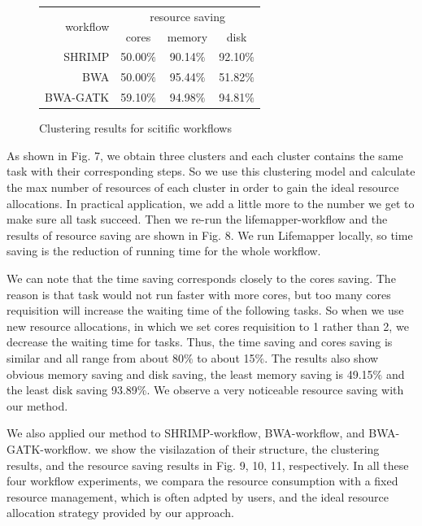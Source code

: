 \documentclass[conference]{IEEEtran}
\begin{document}
\begin{figure}[h]
  \centering 
\begin{tabular}{rccc}
\hline
\multirow{2}{*}{workflow} & \multicolumn{3}{c}{resource saving}\\
& cores & memory & disk\\
\hline
SHRIMP & 50.00$\%$ & 90.14$\%$ & 92.10$\%$\\
BWA & 50.00$\%$ & 95.44$\%$ & 51.82$\%$\\
BWA-GATK & 59.10$\%$ & 94.98$\%$ & 94.81$\%$\\
\hline
\end{tabular} 
\caption{Clustering results for scitific workflows}
\end{figure}

As shown in Fig. 7, we obtain three clusters and each cluster contains the same task with their corresponding steps. So we use this clustering model and calculate the max number of resources of each cluster in order to gain the ideal resource allocations. In practical application, we add a little more to the number we get to make sure all task succeed. Then we re-run the lifemapper-workflow and the results of resource saving are shown in Fig. 8. We run Lifemapper locally, so time saving is the reduction of running time for the whole workflow.

We can note that the time saving corresponds closely to the cores saving. The reason is that task would not run faster with more cores, but too many cores requisition will increase the waiting time of the following tasks. So when we use new resource allocations, in which we set cores requisition to 1 rather than 2, we decrease the waiting time for tasks. Thus, the time saving and cores saving is similar and all range from about 80$\%$ to about 15$\%$. The results also show obvious memory saving and disk saving, the least memory saving is 49.15$\%$ and the least disk saving 93.89$\%$. We observe a very noticeable resource saving with our method.

We also applied our method to SHRIMP-workflow, BWA-workflow, and BWA-GATK-workflow. we show the visilazation of their structure, the clustering results, and the resource saving results in Fig. 9, 10, 11, respectively. In all these four workflow experiments, we compara the resource consumption with a fixed resource management, which is often adpted by users, and the ideal resource allocation strategy provided by our approach.
\end{document}
